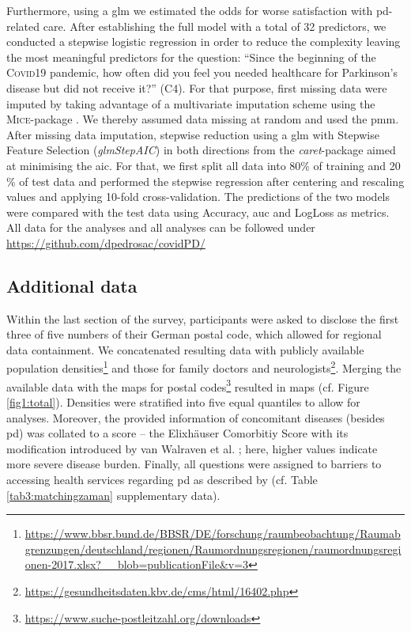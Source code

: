 \documentclass{bmcart}
\begin{document}
Furthermore, using a \ac{glm} we estimated the odds for worse satisfaction with \ac{pd}-related care. After establishing the full model with a total of 32 predictors, we conducted a stepwise logistic regression in order to reduce the complexity leaving the most meaningful predictors for the question: ``Since the beginning of the \textsc{Covid}19 pandemic, how often did you feel you needed healthcare for Parkinson’s disease but did not receive it?'' (C4). For that purpose, first missing data were imputed by taking advantage of a multivariate imputation scheme using the \textsc{Mice}-package \cite{vanbuuren2011}. We thereby assumed data missing at random and used the \ac{pmm}. After missing data imputation, stepwise reduction using a \ac{glm} with Stepwise Feature Selection (\textit{glmStepAIC}) in both directions from the \textit{caret}-package \cite{kuhn2008} aimed at minimising the \ac{aic}. For that, we first split all data into 80\% of training and 20 \% of test data and performed the stepwise regression after centering and rescaling values and applying 10-fold cross-validation. The predictions of the two models were compared with the test data using Accuracy, \ac{auc} and LogLoss as metrics. All data for the analyses and all analyses can be followed under \url{https://github.com/dpedrosac/covidPD/}

\subsection*{Additional data}
Within the last section of the survey, participants were asked to disclose the first three of five numbers of their German postal code, which allowed for regional data containment. We concatenated resulting data with publicly available population densities\footnote{\url{https://www.bbsr.bund.de/BBSR/DE/forschung/raumbeobachtung/Raumabgrenzungen/deutschland/regionen/Raumordnungsregionen/raumordnungsregionen-2017.xlsx?\_\_blob=publicationFile\&v=3}} and those for family doctors and neurologists\footnote{\url{https://gesundheitsdaten.kbv.de/cms/html/16402.php}}. Merging the available data with the maps for postal codes\footnote{\url{https://www.suche-postleitzahl.org/downloads}} resulted in maps (cf. Figure \ref{fig1:total}). Densities were stratified into five equal quantiles to allow for analyses. Moreover, the provided information of concomitant diseases (besides \ac{pd}) was collated to a score -- the Elixhäuser Comorbitiy Score with its modification introduced by van Walraven et al. \cite{van2009modification}; here, higher values indicate more severe disease burden. Finally, all questions were assigned to barriers to accessing health services regarding \ac{pd} as described by \cite{zaman2021barriers} (cf. Table \ref{tab3:matchingzaman} supplementary data).
\end{document}
